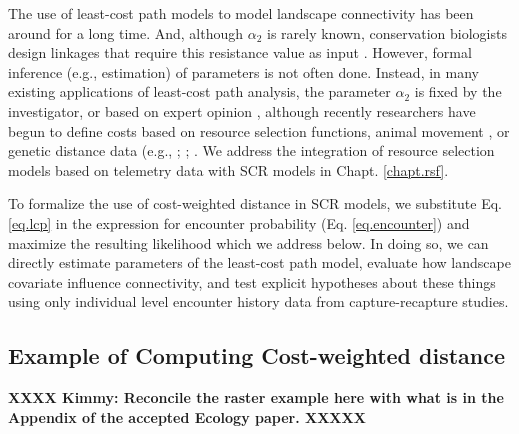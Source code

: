 The use of least-cost path models to model landscape connectivity has
been around for a long time. And, although $\alpha_{2}$ is rarely
known, conservation biologists design linkages that require this
resistance value as input \citep[see][and articles cited
therein]{beier_etal:2008}.  However, formal inference (e.g.,
estimation) of parameters is not often done.  Instead, in many
existing applications of least-cost path analysis, the parameter
$\alpha_{2}$ is fixed by the investigator, or based on expert opinion
\citep{beier_etal:2008}, although recently researchers have begun to
define costs based on resource selection functions, animal movement
\citep{tracy:2006, fortin_etal:2005}, or genetic distance data (e.g.,
\citet{gerlach_musolf:2000}; \citet{epps_etal:2007};
\citet{schwartz_etal:2009}. We address the integration of resource
selection models based on telemetry data with SCR models in
Chapt. \ref{chapt.rsf}.


To formalize the use of cost-weighted distance in SCR models, we 
substitute Eq. \ref{eq.lcp} in the expression for encounter
probability (Eq. \ref{eq.encounter}) and maximize the resulting
likelihood which we address below. In doing so, we can directly 
estimate parameters of the least-cost path model, evaluate how 
landscape covariate influence connectivity, and test explicit hypotheses
about these things using only individual level encounter history data
from capture-recapture studies.


\subsection{Example of Computing Cost-weighted distance}


{\bf XXXX Kimmy: Reconcile the raster example here with what is in the
  Appendix of the accepted Ecology paper. XXXXX}

